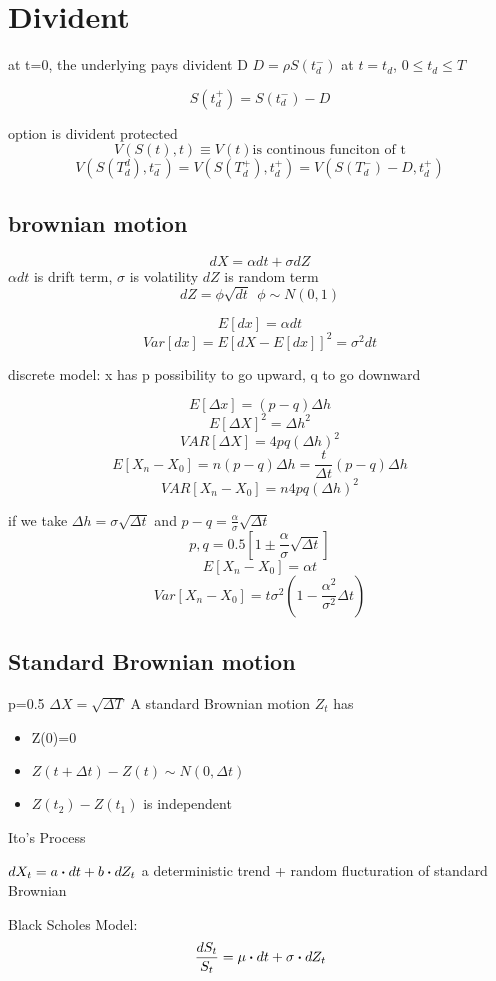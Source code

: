 \documentclass[10pt]{article}
\theoremstyle{break}
\begin{document}
\section{Divident}
at t=0, the underlying pays divident D
$D=\rho S(t^-_d)$ at $t=t_d$, $0\leq t_d\leq T$

$$S(t_d^+)=S(t_d^-)-D$$

option is divident protected
$$V(S(t),t)\equiv V(t)\text{is continous funciton of t}$$ 
$$V(S(T_d^d),t_d^-)=V(S(T_d^+),t_d^+)=V(S(T_d^-)-D,t_d^+)$$

\subsection{brownian motion}
    $$dX=\alpha dt+\sigma dZ$$
    $\alpha dt$ is drift term, $\sigma$ is volatility $dZ$ is random term 
    $$dZ=\phi \sqrt{dt}~~\phi\sim N(0,1) $$

    $$E[dx]=\alpha dt$$
    $$Var[dx]=E[dX-E[dx]]^2=\sigma^2 dt$$

    discrete model: x has p possibility to go upward, q to go downward

    $$E[\Delta x]=(p-q)\Delta h$$
    $$E[\Delta X]^2 = \Delta h^2$$
    $$VAR[\Delta X]=4pq(\Delta h)^2$$
    $$E[X_n-X_0] = n(p-q)\Delta h=\frac{t}{\Delta t}(p-q)\Delta h$$
    $$VAR[X_n-X_0]=n4pq(\Delta h)^2$$

    if we take $\Delta h=\sigma \sqrt{\Delta t}$ and $p-q=\frac{\alpha}{\sigma}\sqrt{\Delta t}$
    $$p,q=0.5[1\pm \frac{\alpha}{\sigma}\sqrt{\Delta t}]$$
    $$E[X_n-X_0]=\alpha t$$
    $$Var[X_n-X_0]=t\sigma^2(1-\frac{\alpha^2}{\sigma^2}\Delta t)$$

\subsection{Standard Brownian motion}
    p=0.5 $\Delta X=\sqrt{\Delta T}$
    A standard Brownian motion $Z_t$ has 
    \begin{itemize}
        \item Z(0)=0
        \item $Z(t+\Delta t)-Z(t)\sim N(0,\Delta t)$
        \item $Z(t_2)-Z(t_1)$ is independent
    \end{itemize}
    Ito's Process 

    $dX_t=a\dotproduct dt+b\dotproduct dZ_t$
    a deterministic trend + random flucturation of standard Brownian

    Black Scholes Model:
    $$\frac{dS_t}{S_t}=\mu\dotproduct dt+\sigma\dotproduct dZ_t$$
\end{document}
